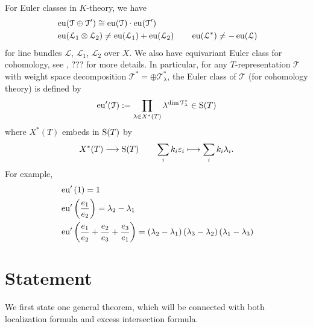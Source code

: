 \begin{remark}
For Euler classes in $K$-theory, we have
\begin{equation*}
\begin{aligned}
  &  \operatorname{\operatorname{eu}}(\mathcal{T} \oplus \mathcal{T}') \cong \operatorname{\operatorname{eu}}(\mathcal{T}) \cdot \operatorname{\operatorname{eu}}(\mathcal{T}')            \\ 
  & \operatorname{\operatorname{eu}}(\mathcal{L}_1 \otimes \mathcal{L}_2) \neq \operatorname{\operatorname{eu}}(\mathcal{L}_1 )+\operatorname{\operatorname{eu}}( \mathcal{L}_2) \qquad \operatorname{\operatorname{eu}}(\mathcal{L}^{*}) \neq -\operatorname{\operatorname{eu}}(\mathcal{L})
\end{aligned}
\end{equation*}
for line bundles $\mathcal{L}$, $\mathcal{L}_1$, $\mathcal{L}_2$ over $X$. We also have equivariant Euler class for cohomology, see \cite[Chapter 9]{przezdziecki2015geometric}, ??? for more details. In particular, for any $T$-representation $\mathcal{T}$ with weight space decomposition $\mathcal{T}^{*} = \oplus \mathcal{T}_{\lambda}^{*}$, the Euler class of $\mathcal{T}$ (for cohomology theory) is defined by
$$\operatorname{\operatorname{eu}}'(\mathcal{T}):= \prod_{\lambda \in X^{*}(T)} \lambda^{\dim \mathcal{T}_{\lambda}^{*}} \in \operatorname{\operatorname{S}}(T) $$
where $X^{*}(T)$ embeds in $\operatorname{\operatorname{S}}(T)$ by
$$X^{*}(T) \longrightarrow \operatorname{\operatorname{S}}(T) \qquad \sum_{i}k_i \varepsilon_i \longmapsto \sum_{i}k_i \lambda_i.$$
For example,
\begin{equation*}
\begin{aligned}
  &\operatorname{\operatorname{eu}}'\left( 1 \right)=  1\\ 
    &\operatorname{\operatorname{eu}}'\left( \frac{e_1}{e_2} \right)=  \lambda_2-\lambda_1\\ 
      &\operatorname{\operatorname{eu}}'\left(\frac{e_1}{e_2}+\frac{e_2}{e_3}+\frac{e_3}{e_1} \right)=  \left(\lambda_2-\lambda_1\right)\left(\lambda_3-\lambda_2\right)\left(\lambda_1-\lambda_3\right)\\ 
\end{aligned}
\end{equation*}
\end{remark}

\section{Statement}\label{sec:statement_localization}
We first state one general theorem, which will be connected with both localization formula and excess intersection formula.

